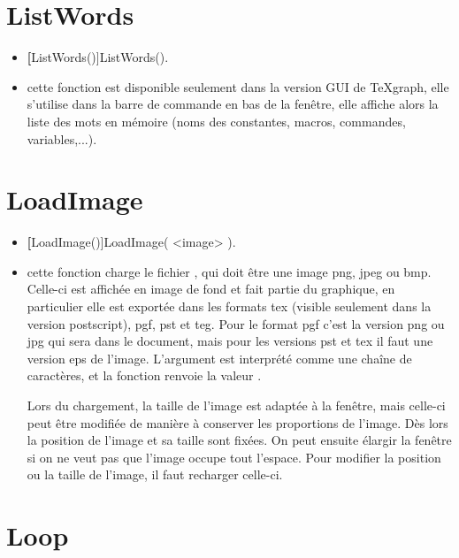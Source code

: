 \section{ListWords}\label{cmdListWords}

\begin{itemize}
 \item \util \textbf[ListWords()]{ListWords()}.
 \item \desc cette fonction est disponible seulement dans la version GUI de TeXgraph, elle s'utilise dans la barre de commande en bas de la fenêtre, elle affiche alors la liste des mots en mémoire (noms des constantes, macros, commandes, variables,...).
\end{itemize}

\section{LoadImage}\label{cmdLoadImage}

\begin{itemize}
 \item \util \textbf[LoadImage()]{LoadImage( <image> )}.
 \item \desc cette fonction charge le fichier , qui doit être une image png, jpeg ou bmp. Celle-ci est affichée en image de fond et fait partie du graphique, en particulier elle est exportée dans les formats tex (visible seulement dans la version postscript), pgf, pst et teg. Pour le format pgf c'est la version png ou jpg qui sera dans le document, mais pour les versions pst et tex il faut une version eps de l'image. L'argument est interprété comme une chaîne de caractères, et la fonction renvoie la valeur \Nil.

 Lors du chargement, la taille de l'image est adaptée à la fenêtre, mais celle-ci peut être modifiée de manière à conserver les proportions de l'image. Dès lors la position de l'image et sa taille sont fixées. On peut ensuite élargir la fenêtre si on ne veut pas que l'image occupe tout l'espace. Pour modifier la position ou la taille de l'image, il faut recharger celle-ci.
\end{itemize}


\section{Loop}\label{cmdLoop}

